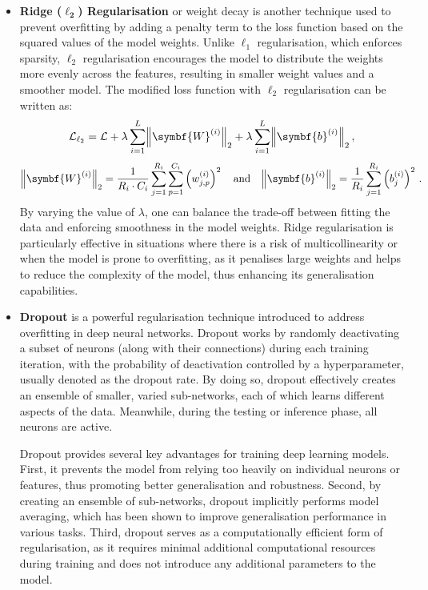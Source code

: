 \begin{itemize}[leftmargin=1.5em]
    \item \textbf{Ridge ($\symbf{\ell_2}$) Regularisation} or weight decay is another technique used to prevent overfitting by adding a penalty term to the loss function based on the squared values of the model weights. Unlike $\ell_1$ regularisation, which enforces sparsity, $\ell_2$ regularisation encourages the model to distribute the weights more evenly across the features, resulting in smaller weight values and a smoother model. The modified loss function with $\ell_2$ regularisation can be written as:
          \begin{equation}
              \mathcal{L}_{\ell_2} = \mathcal{L} + \lambda\sum\limits_{i=1}^{L}\norm*{\symbf{W}^{(i)}}_2 + \lambda\sum\limits_{i=1}^{L}\norm*{\symbf{b}^{(i)}}_2 \,,
          \end{equation}
          \begin{equation}
              \norm*{\symbf{W}^{(i)}}_2 = \dfrac{1}{R_i \cdot C_i} \sum\limits_{j=1}^{R_i} \sum\limits_{p=1}^{C_i} \left( w_{j,p}^{(i)} \right)^2
              \quad \text{and} \quad
              \norm*{\symbf{b}^{(i)}}_2 = \dfrac{1}{R_i} \sum\limits_{j=1}^{R_i} \left( b_{j}^{(i)} \right)^2 \,.
          \end{equation}
          By varying the value of $\lambda$, one can balance the trade-off between fitting the data and enforcing smoothness in the model weights. Ridge regularisation is particularly effective in situations where there is a risk of multicollinearity or when the model is prone to overfitting, as it penalises large weights and helps to reduce the complexity of the model, thus enhancing its generalisation capabilities.

    \item \textbf{Dropout} is a powerful regularisation technique introduced to address overfitting in deep neural networks. Dropout works by randomly deactivating a subset of neurons (along with their connections) during each training iteration, with the probability of deactivation controlled by a hyperparameter, usually denoted as the dropout rate. By doing so, dropout effectively creates an ensemble of smaller, varied sub-networks, each of which learns different aspects of the data. Meanwhile, during the testing or inference phase, all neurons are active.

          Dropout provides several key advantages for training deep learning models. First, it prevents the model from relying too heavily on individual neurons or features, thus promoting better generalisation and robustness. Second, by creating an ensemble of sub-networks, dropout implicitly performs model averaging, which has been shown to improve generalisation performance in various tasks. Third, dropout serves as a computationally efficient form of regularisation, as it requires minimal additional computational resources during training and does not introduce any additional parameters to the model.


\end{itemize}
